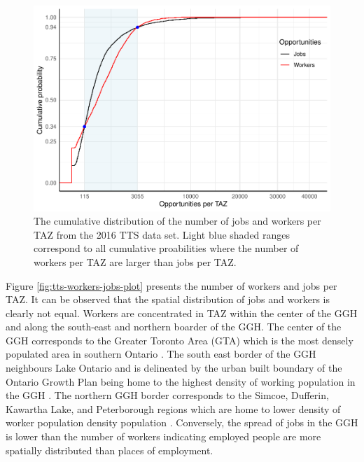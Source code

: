 \documentclass[Royal,times,sageh]{sagej}
\begin{document}
\begin{figure}
\includegraphics[width=1\linewidth]{Manuscript-Data-Package_files/figure-latex/ECD-plot-1} \caption{\label{fig:ECD-plot}The cumulative distribution of the number of jobs and workers per TAZ from the 2016 TTS data set. Light blue shaded ranges correspond to all cumulative proabilities where the number of workers per TAZ are larger than jobs per TAZ. }\label{fig:ECD-plot}
\end{figure}

Figure \ref{fig:tts-workers-jobs-plot} presents the number of workers
and jobs per TAZ. It can be observed that the spatial distribution of
jobs and workers is clearly not equal. Workers are concentrated in TAZ
within the center of the GGH and along the south-east and northern
boarder of the GGH. The center of the GGH corresponds to the Greater
Toronto Area (GTA) which is the most densely populated area in southern
Ontario \citep{statistics_canada_daily_2022}. The south east border of
the GGH neighbours Lake Ontario and is delineated by the urban built
boundary of the Ontario Growth Plan being home to the highest density of
working population in the GGH
\citep{ontario_built_2019, auditor_general_of_ontario_value_2021}. The
northern GGH border corresponds to the Simcoe, Dufferin, Kawartha Lake,
and Peterborough regions which are home to lower density of worker
population density population
\citep{auditor_general_of_ontario_value_2021}. Conversely, the spread of
jobs in the GGH is lower than the number of workers indicating employed
people are more spatially distributed than places of employment.
\end{document}
